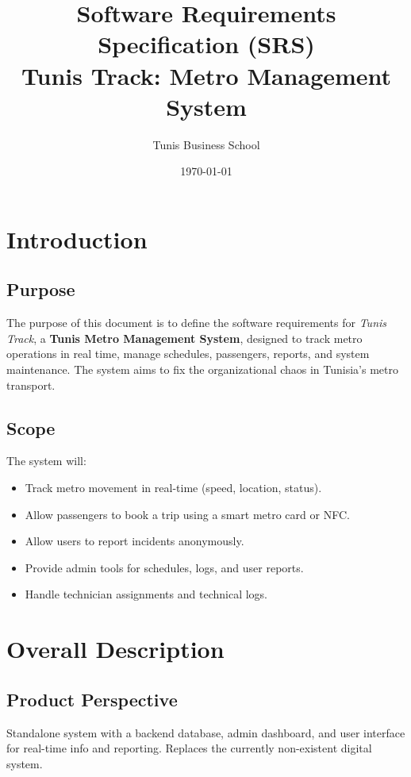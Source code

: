 \documentclass[12pt]{article}
\title{\textbf{Software Requirements Specification (SRS)\\Tunis Track: Metro Management System}}
\author{
  Tunis Business School
}
\date{\today}
\begin{document}
\maketitle
\tableofcontents
\newpage

\section{Introduction}

\subsection{Purpose}
The purpose of this document is to define the software requirements for \textit{Tunis Track}, a \textbf{Tunis Metro Management System}, designed to track metro operations in real time, manage schedules, passengers, reports, and system maintenance. The system aims to fix the organizational chaos in Tunisia’s metro transport.

\subsection{Scope}
The system will:
\begin{itemize}[noitemsep]
  \item Track metro movement in real-time (speed, location, status).
  \item Allow passengers to book a trip using a smart metro card or NFC.
  \item Allow users to report incidents anonymously.
  \item Provide admin tools for schedules, logs, and user reports.
  \item Handle technician assignments and technical logs.
\end{itemize}

\section{Overall Description}

\subsection{Product Perspective}
Standalone system with a backend database, admin dashboard, and user interface for real-time info and reporting. Replaces the currently non-existent digital system.
\end{document}
